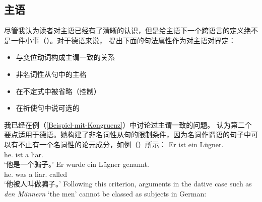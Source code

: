 \subsection{主语}
\label{Abschnitt-Subjekt}
尽管我认为读者对主语已经有了清晰的认识，但是给主语下一个跨语言的定义绝不是一件小事（）。对于德语来说，\citet{Reis82} 提出下面的句法属性作为对主语对界定：
\begin{itemize}
\item 与变位动词构成主谓一致的关系
\item 非名词性从句中的主格
\item 在不定式中被省略（控制）
\item 在祈使句中说可选的
\end{itemize}
我已经在例（\ref{Beispiel-mit-Kongruenz}）中讨论过主谓一致的问题。\citet{Reis82} 认为第二个要点适用于德语。她构建了非名词性从句的限制条件，因为名词作谓语的句子中可以有不止有一个名词性的论元成分，如例（）所示：
\eal
\ex
\gll Er ist ein Lügner.\\
     he.\nom{} ist a liar.\nom{}\\
\glt `他是一个骗子。'
\ex 
\gll Er wurde ein Lügner genannt.\\
     he.\nom{} was a liar.\nom{} called\\
\glt `他被人叫做骗子。'
\zl
Following this criterion, arguments in the dative case such as \emph{den Männern} `the men' cannot be classed as subjects in German:
